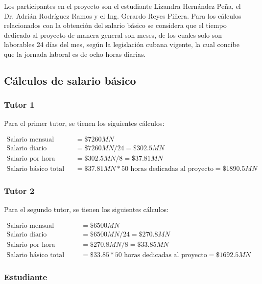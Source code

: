 Los participantes en el proyecto son el estudiante Lizandra Hernández Peña, el Dr. Adrián Rodríguez Ramos y el Ing. Gerardo Reyes Piñera. Para los cálculos relacionados con la obtención del salario básico se considera que el tiempo dedicado al proyecto de manera general son meses, de los cuales solo son laborables 24 días del mes, según la legislación cubana vigente, la cual concibe que la jornada laboral es de ocho horas diarias.

\subsection{Cálculos de salario básico}

\subsubsection{Tutor 1}

Para el primer tutor, se tienen los siguientes cálculos:

\begin{align}
\label{eq:tutor1_salary}
\text{Salario mensual} &= \$7260MN \\
\text{Salario diario} &= \$7260MN / 24 = \$302.5MN \\
\text{Salario por hora laboral} &= \$302.5MN / 8 = \$37.81MN \\
\text{Salario básico total} &= \$37.81MN * 50 \text{ horas dedicadas al proyecto} = \$1890.5MN
\end{align}

\subsubsection{Tutor 2}

Para el segundo tutor, se tienen los siguientes cálculos:

\begin{align}
\label{eq:tutor2_salary}
\text{Salario mensual} &= \$6500MN \\
\text{Salario diario} &= \$6500MN / 24 = \$270.8MN \\
\text{Salario por hora laboral} &= \$270.8MN / 8 = \$33.85MN \\
\text{Salario básico total} &= \$33.85 * 50 \text{ horas dedicadas al proyecto} = \$1692.5MN
\end{align}

\subsubsection{Estudiante}

